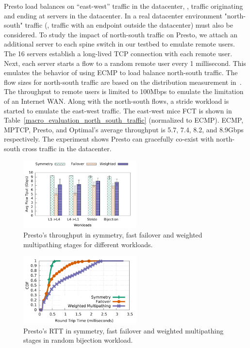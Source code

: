 Presto load balances on ``east-west'' traffic in the datacenter, \ie{}, traffic
originating and ending at servers in the datacenter. 
In a real datacenter environment "north-south" traffic (\ie{}, traffic with an endpoint outside the datacenter)
must also be considered. 
To study the impact of north-south traffic on Presto, we attach an additional server to 
each spine switch in our testbed to emulate remote users. 
The 16 servers establish a long-lived TCP connection with each remote user. 
Next, each server starts a flow to a random remote user every 1 millisecond. This emulates  
the behavior of using ECMP to load balance north-south traffic.
The flow sizes for north-south traffic are based on the distribution measurement in~\cite{he2013next}. 
The throughput to remote users is limited to 100Mbps to emulate the limitation of an Internet WAN. 
Along with the north-south flows, 
a stride workload is started to emulate the east-west traffic. 
The east-west mice FCT is shown in Table~\ref{macro_evaluation_north_south_traffic} (normalized to ECMP). 
ECMP, MPTCP, Presto, and Optimal's average throughput is 
5.7, 7.4, 8.2, and 8.9Gbps respectively. 
The experiment shows Presto can gracefully co-exist with north-south cross traffic
in the datacenter.



\begin{figure}[t]
        \centering
  \includegraphics[width=0.55\textwidth]{./figures/presto/failure_handling/failover_compare_tput_witherrbar.pdf}
        \caption{Presto's throughput in symmetry, fast failover and weighted multipathing stages for different workloads.}
        \label{failover_compare_tput}
\end{figure}

\begin{figure}[t]
        \centering
  \includegraphics[width=0.55\textwidth]{./figures/presto/failure_handling/failover_compare_sockperf_bijection_mice.pdf}
        \caption{Presto's RTT in symmetry, fast failover and weighted multipathing stages in  random bijection workload.}
        \label{failover_compare_sockperf_bijection}
\end{figure}

